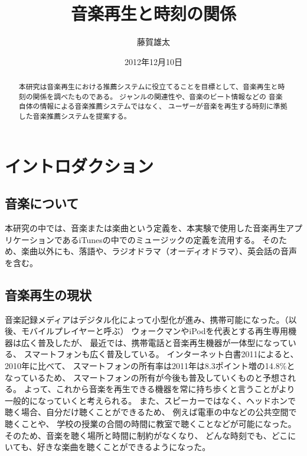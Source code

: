 \documentclass[11pt, onecolumn]{jsarticle}
\begin{document}
\title{音楽再生と時刻の関係}
\author{藤賀雄太}
\date{2012年12月10日}
\maketitle
\begin{abstract}
本研究は音楽再生における推薦システムに役立てることを目標として、音楽再生と時刻の関係を調べたものである。
ジャンルの関連性や、音楽のビート情報などの
音楽自体の情報による音楽推薦システムではなく、
ユーザーが音楽を再生する時刻に準拠した音楽推薦システムを提案する。
\end{abstract}
\tableofcontents


\section{イントロダクション}
\subsection{音楽について}
本研究の中では、音楽または楽曲という定義を、本実験で使用した音楽再生アプリケーションであるiTunesの中でのミュージックの定義を流用する。
そのため、楽曲以外にも、落語や、ラジオドラマ（オーディオドラマ）、英会話の音声を含む。

\subsection{音楽再生の現状}
音楽記録メディアはデジタル化によって小型化が進み、携帯可能になった。（以後、モバイルプレイヤーと呼ぶ）
ウォークマンやiPodを代表とする再生専用機器は広く普及したが、
最近では、携帯電話と音楽再生機器が一体型になっている、
スマートフォンも広く普及している。
インターネット白書2011によると、
2010年に比べて、
スマートフォンの所有率は2011年は8.3ポイント増の14.8\%となっているため、
スマートフォンの所有が今後も普及していくものと予想される。
よって、これから音楽を再生できる機器を常に持ち歩くと言うことがより一般的になっていくと考えられる。
また、スピーカーではなく、ヘッドホンで聴く場合、自分だけ聴くことができるため、
例えば電車の中などの公共空間で聴くことや、
学校の授業の合間の時間に教室で聴くことなどが可能になった。
そのため、音楽を聴く場所と時間に制約がなくなり、
どんな時刻でも、どこにいても、好きな楽曲を聴くことができるようになった。
\end{document}
